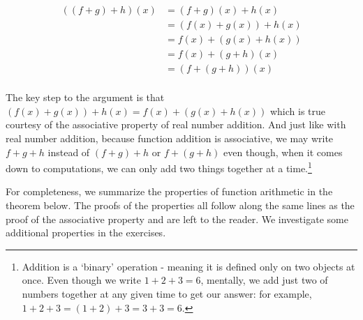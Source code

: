 \begin{align*}
((f+g)+h)(x) & = (f+g)(x)+h(x) \tag{definiton of $((f+g)+h)(x)$} \\
& = (f(x)+g(x))+h(x) \tag{definition of $(f+g)(x)$} \\
& = f(x) + (g(x)+h(x)) \tag{associative property of real number addition} \\
& = f(x) + (g+h)(x) \tag{definition of $(g+h)(x)$} \\
& = (f+(g+h))(x) \tag{definition of $(f+(g+h))(x)$} \\
\end{align*}

The key step  to the argument is that  $(f(x)+g(x))+h(x)   =  f(x) + (g(x)+h(x))$ which is true courtesy of the associative property of real number addition.  And just like with real number addition, because function addition is associative, we may write $f+g+h$ instead of $(f+g)+h$ or $f+(g+h)$ even though, when it comes down to computations, we can only add two things together at a time.\footnote{Addition is a `binary' operation - meaning it is defined only on two objects at once.  Even though we write $1+2+3 = 6$,  mentally, we add just two of  numbers together at any given time to get our answer: for example, $1+2+3 = (1+2)+3 = 3+3 = 6$.}

For completeness, we summarize the properties of function arithmetic in the theorem below.  The proofs of the properties all follow along the same lines as the proof of the associative property and are left to the reader.  We investigate some additional properties in the exercises.

